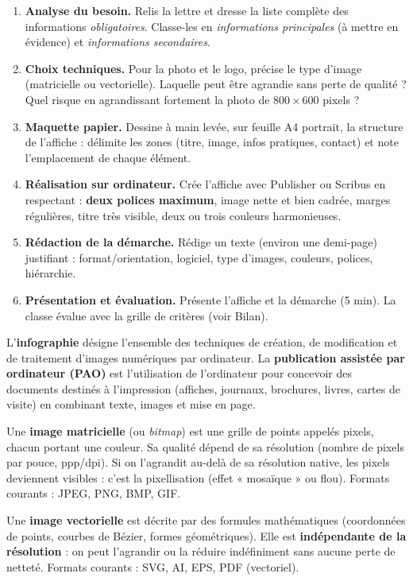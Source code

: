\documentclass[11pt]{article}
\newcommand{\cle}[1]{{\popxbold\color{popdark}#1}}
\newcounter{popsec}
\newcounter{popsub}
\newcommand{\courssub}[1]{%
  \stepcounter{popsub}%
  \par\vspace{9pt}\noindent{\popxbold\fontsize{11.5}{13}\selectfont\color{popink}{\color{poporange}\thepopsec.\thepopsub}\hspace{6pt}#1}\par\nopagebreak\vspace{4pt}
}
\begin{document}
\begin{enumerate}
\item \textbf{Analyse du besoin.} Relis la lettre et dresse la liste complète des informations \emph{obligatoires}. Classe-les en \emph{informations principales} (à mettre en évidence) et \emph{informations secondaires}.
\item \textbf{Choix techniques.} Pour la photo et le logo, précise le type d'image (matricielle ou vectorielle). Laquelle peut être agrandie sans perte de qualité ? Quel risque en agrandissant fortement la photo de $800 \times 600$ pixels ?
\item \textbf{Maquette papier.} Dessine à main levée, sur feuille A4 portrait, la structure de l'affiche : délimite les zones (titre, image, infos pratiques, contact) et note l'emplacement de chaque élément.
\item \textbf{Réalisation sur ordinateur.} Crée l'affiche avec Publisher ou Scribus en respectant : \textbf{deux polices maximum}, image nette et bien cadrée, marges régulières, titre très visible, deux ou trois couleurs harmonieuses.
\item \textbf{Rédaction de la démarche.} Rédige un texte (environ une demi-page) justifiant : format/orientation, logiciel, type d'images, couleurs, polices, hiérarchie.
\item \textbf{Présentation et évaluation.} Présente l'affiche et la démarche (5 min). La classe évalue avec la grille de critères (voir Bilan).
\end{enumerate}

\courssub{Apports théoriques (Ressources à mobiliser)}

\begin{definition}
L'\textbf{infographie} désigne l'ensemble des techniques de création, de modification et de traitement d'images numériques par ordinateur.
La \textbf{publication assistée par ordinateur (PAO)} est l'utilisation de l'ordinateur pour concevoir des documents destinés à l'impression (affiches, journaux, brochures, livres, cartes de visite) en combinant texte, images et mise en page.
\end{definition}

\begin{definition}
Une \textbf{image matricielle} (ou \emph{bitmap}) est une grille de points appelés \cle{pixels}, chacun portant une couleur. Sa qualité dépend de sa \cle{résolution} (nombre de pixels par pouce, ppp/dpi). Si on l'agrandit au-delà de sa résolution native, les pixels deviennent visibles : c'est la \cle{pixellisation} (effet « mosaïque » ou flou). Formats courants : JPEG, PNG, BMP, GIF.

Une \textbf{image vectorielle} est décrite par des formules mathématiques (coordonnées de points, courbes de Bézier, formes géométriques). Elle est \textbf{indépendante de la résolution} : on peut l'agrandir ou la réduire indéfiniment sans aucune perte de netteté. Formats courants : SVG, AI, EPS, PDF (vectoriel).
\end{definition}
\end{document}
